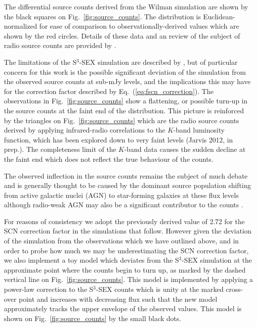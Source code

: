 \documentclass{aa}
\begin{document}
The differential source counts derived from the Wilman simulation are shown by the black squares on Fig.~\ref{fig:source_counts}. The distribution is Euclidean-normalized for ease of comparison to observationally-derived values which are shown by the red circles. Details of these data and an review of the subject of radio source counts are provided by \citet{deZotti-surveys}. 

The limitations of the S$^{3}$-SEX simulation are described by \citet{Wilman-simulation}, but of particular concern for this work is the possible significant deviation of the simulation from the observed source counts at sub-mJy levels, and the implications this may have for the correction factor described by Eq.~(\ref{eq:fscn_correction}). The observations in Fig.~\ref{fig:source_counts} show a flattening, or possible turn-up in the source counts at the faint end of the distribution. This picture is reinforced by the triangles on Fig.~\ref{fig:source_counts} which are the radio source counts derived by applying infrared-radio correlations to the $K$-band luminosity function, which has been explored down to very faint levels (Jarvis 2012, in prep.). The completeness limit of the $K$-band data causes the sudden decline at the faint end which does not reflect the true behaviour of the counts.

The observed inflection in the source counts remains the subject of much debate and is generally thought to be caused by the dominant source population shifting from active galactic nuclei (AGN) to star-forming galaxies at these flux levels \citep[e.g.][]{Padovani-VLA-Chandra-DFS} although radio-weak AGN may also be a significant contributor to the counts \citep{Simpson-Subaru-XMM}. 

For reasons of consistency we adopt the previously derived value of 2.72 for the SCN correction factor in the simulations that follow. However given the deviation of the simulation from the observations which we have outlined above, and in order to probe how much we may be underestimating the SCN correction factor, we also implement a toy model which deviates from the S$^{3}$-SEX simulation at the approximate point where the counts begin to turn up, as marked by the dashed vertical line on Fig.~\ref{fig:source_counts}. This model is implemented by applying a power-law correction to the S$^{3}$-SEX counts which is unity at the marked cross-over point and increases with decreasing flux such that the new model approximately tracks the upper envelope of the observed values. This model is shown on Fig.~\ref{fig:source_counts} by the small black dots. 
\end{document}
